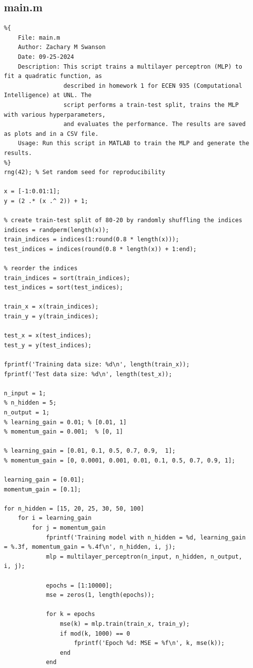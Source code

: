 \documentclass[11pt,pdftex,portrait,letterpaper]{article}
\begin{document}
\subsection{main.m} \label{sec:appMain}
\begin{lstlisting}
%{
    File: main.m
    Author: Zachary M Swanson
    Date: 09-25-2024
    Description: This script trains a multilayer perceptron (MLP) to fit a quadratic function, as
                 described in homework 1 for ECEN 935 (Computational Intelligence) at UNL. The
                 script performs a train-test split, trains the MLP with various hyperparameters,
                 and evaluates the performance. The results are saved as plots and in a CSV file.
    Usage: Run this script in MATLAB to train the MLP and generate the results.
%}
rng(42); % Set random seed for reproducibility

x = [-1:0.01:1];
y = (2 .* (x .^ 2)) + 1;

% create train-test split of 80-20 by randomly shuffling the indices
indices = randperm(length(x));
train_indices = indices(1:round(0.8 * length(x)));
test_indices = indices(round(0.8 * length(x)) + 1:end);

% reorder the indices
train_indices = sort(train_indices);
test_indices = sort(test_indices);

train_x = x(train_indices);
train_y = y(train_indices);

test_x = x(test_indices);
test_y = y(test_indices);

fprintf('Training data size: %d\n', length(train_x));
fprintf('Test data size: %d\n', length(test_x));

n_input = 1;
% n_hidden = 5;
n_output = 1;
% learning_gain = 0.01; % [0.01, 1]
% momentum_gain = 0.001;  % [0, 1]

% learning_gain = [0.01, 0.1, 0.5, 0.7, 0.9,  1];
% momentum_gain = [0, 0.0001, 0.001, 0.01, 0.1, 0.5, 0.7, 0.9, 1];

learning_gain = [0.01];
momentum_gain = [0.1];

for n_hidden = [15, 20, 25, 30, 50, 100]
    for i = learning_gain
        for j = momentum_gain
            fprintf('Training model with n_hidden = %d, learning_gain = %.3f, momentum_gain = %.4f\n', n_hidden, i, j);
            mlp = multilayer_perceptron(n_input, n_hidden, n_output, i, j);

            epochs = [1:10000];
            mse = zeros(1, length(epochs));

            for k = epochs
                mse(k) = mlp.train(train_x, train_y);
                if mod(k, 1000) == 0
                    fprintf('Epoch %d: MSE = %f\n', k, mse(k));
                end
            end


\end{lstlisting}
\end{document}
